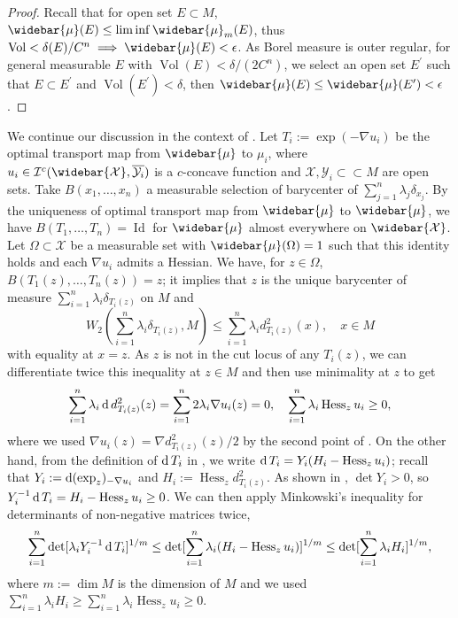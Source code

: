 \begin{proof}
	Recall that for open set $E \subset M$, $\widebar{\mu}(E) \leq \liminf \widebar{\mu}_m(E)$, thus
	$\operatorname{Vol} < \delta(E) / C^n \implies \widebar{\mu}(E) < \epsilon$.
	As Borel measure is outer regular, for general measurable $E$ with
	$\operatorname{Vol}(E) < \delta / (2C^n)$,
	we select an open set $E^\prime$ such that
	$ E \subset E^\prime$ and $ \operatorname{Vol}(E^\prime) < \delta$,
	then $\widebar{\mu}(E) \leq \widebar{\mu}(E^\prime) < \epsilon$.
\end{proof}

We continue our discussion in the context of .
Let $T_i:=\exp(-\nabla u_i)$ be the optimal transport map from $\widebar{\mu}$ to $\mu_i$,
where $u_i \in \mathcal{I}^c(\widebar{\mathcal{X}}, \overline{\mathcal{Y}_i})$ is a $c$-concave function
and $\mathcal{X}, \mathcal{Y}_i \subset \subset M$ are open sets.
Take $B(x_1,\ldots,x_n)$ a measurable selection of barycenter of $\sum_{j=1}^n \lambda_j \delta_{x_j}$.
By the uniqueness of optimal transport map from $\widebar{\mu}$ to $\widebar{\mu}$,
we have $B(T_1, \ldots, T_n) = \operatorname{Id}$ for $\widebar{\mu}$ almost everywhere on $\widebar{\mathcal{X}}$.
Let $\Omega \subset \mathcal{X} $ be a measurable set with $\widebar{\mu}(\Omega) = 1 $ such that
this identity holds and each $\nabla u_i$ admits a Hessian.
We have, for $z \in \Omega$, $B(T_1(z), \ldots, T_n(z))=z$;
it implies that $z$ is the unique barycenter of
measure $\sum_{i=1}^n \lambda_i \delta_{T_i(z)}$ on $M$ and
\[
	W_2(\sum_{i=1}^n \lambda_i \delta_{T_i(z)}, M) \leq \sum_{i=1}^n \lambda_i d_{T_i(z)}^2(x),\quad x \in M
\] with equality at $x=z$.
As $z$ is not in the cut locus of any $T_i(z)$,
we can differentiate twice this inequality at $z \in M$
and then use minimality at $z$ to get
\[
	\sum_{i=1}^n \lambda_i \operatorname{d} d^2_{T_i(z)} (z) =\sum_{i=1}^n 2 \lambda_i \nabla u_i (z) =0
	,\quad \sum_{i=1}^n \lambda_i \operatorname{Hess}_z u_i \geq 0,
\]
where we used $\nabla u_i(z) = \nabla d^2_{T_i(z)}(z)/2$ by the second point of .
On the other hand, from the definition of $\operatorname{d} T_i$ in ,
we write $\operatorname{d} T_i = Y_i ( H_i - \operatorname{Hess}_z u_i)$;
recall that $Y_i := \operatorname{d} (\exp_z)_{-\nabla u_i}$
and $H_i := \operatorname{Hess}_z d^2_{T_i(z)}$.
As shown in \cite[Lemma 2.1]{cordero2001riemannian}, $\det Y_i >0$,
so $Y_i^{-1} \operatorname{d} T_i = H_i - \operatorname{Hess}_z u_i \geq 0$.
We can then apply Minkowski's
inequality for determinants of non-negative matrices twice,
\[
	\sum_{i=1}^{n} \det[ \lambda_i Y_i^{-1} \operatorname{d} T_i]^{1/m}
	\leq
	\det [\sum_{i=1}^n \lambda_i(H_i - \operatorname{Hess}_z u_i)]^{1/m}
	\leq
	\det [\sum_{i=1}^n \lambda_i H_i]^{1/m},
\]
where $m := \dim M$ is the dimension of $M$
and we used $\sum_{i=1}^n \lambda_i H_i \geq \sum_{i=1}^n \lambda_i \operatorname{Hess}_z u_i \geq 0$.

